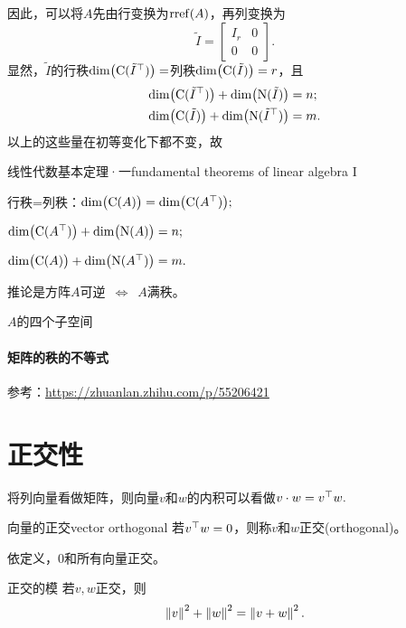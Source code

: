 因此，可以将$A$先由行变换为$\operatorname{rref}(A)$，再列变换为
\[
	\tilde I=\begin{bmatrix}
		I_r&0\\0&0
	\end{bmatrix}.
\]
显然，$\tilde I$的行秩$\dim\bigl(\operatorname{C}(\tilde I^\top)\bigr)=$列秩$\dim\bigl(\operatorname{C}(\tilde I)\bigr)=r$，且
\begin{align*}
	\dim\bigl(\operatorname{C}(\tilde I^\top)\bigr)+\dim\bigl(\operatorname{N}(\tilde I)\bigr)&=n;\\
	\dim\bigl(\operatorname{C}(\tilde I)\bigr)+\dim\bigl(\operatorname{N}(\tilde I^\top)\bigr)&=m.
\end{align*}
以上的这些量在初等变化下都不变，故
\begin{theorem}{线性代数基本定理·一}{fundamental theorems of linear algebra I}
	\begin{compactenum}
		\item 行秩=列秩：$\dim\bigl(\operatorname{C}(A)\bigr)=\dim\bigl(\operatorname{C}(A^\top)\bigr);$
		\item $\dim\bigl(\operatorname{C}(A^\top)\bigr)+\dim\bigl(\operatorname{N}(A)\bigr)=n;$
		\item $\dim\bigl(\operatorname{C}(A)\bigr)+\dim\bigl(\operatorname{N}(A^\top)\bigr)=m.$
	\end{compactenum}
\end{theorem}
推论是方阵$A$可逆$\enspace\Leftrightarrow\enspace A$满秩。
\begin{center}
    \tikzchap $A$的四个子空间
\end{center}
\paragraph{矩阵的秩的不等式}参考：\url{https://zhuanlan.zhihu.com/p/55206421}
\begin{theorem}{}{}
	
\end{theorem}
\clearpage
\section{正交性}
将列向量看做矩阵，则向量$v$和$w$的内积可以看做$v\cdot w = v^\top w.$
\begin{definition}{向量的正交}{vector orthogonal}
	若$v^\top w=0$，则称$v$和$w$正交(orthogonal)。
\end{definition}
依定义，0和所有向量正交。
\begin{theorem}{正交的模}{}
	若$v,w$正交，则
	\begin{align}
		\left\lVert v\right\rVert^2+\left\lVert w\right\rVert^2=\left\lVert v+w\right\rVert^2.
	\end{align}
\end{theorem}
